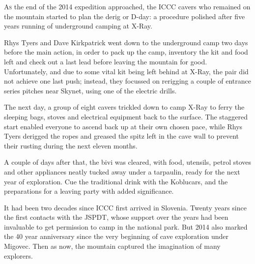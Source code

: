 \begin{tcolorbox}


	\lettrine{A}{s} the end of the 2014 expedition approached, the ICCC cavers who remained on the mountain started to plan the derig or D-day: a procedure polished after five years running of underground camping at X-Ray. 

	Rhys Tyers and Dave Kirkpatrick went down to the underground camp two days before the main action, in order to pack up the camp, inventory the kit and food left and check out a last lead before leaving the mountain for good. Unfortunately, and due to some vital kit being left behind at X-Ray, the pair did not achieve one last push; instead, they focussed on rerigging a couple of entrance series pitches near Skynet, using one of the electric drills. 

	The next day, a group of eight cavers trickled down to camp X-Ray to ferry the sleeping bags, stoves and electrical equipment back to the surface. The staggered start enabled everyone to ascend back up at their own chosen pace, while Rhys Tyers derigged the ropes and greased the spitz left in the cave wall to prevent their rusting during the next eleven months.

	A couple of days after that, the bivi was cleared, with food, utensils, petrol stoves and other appliances neatly tucked away under a tarpaulin, ready for the next year of exploration. Cue the traditional drink with the Koblucars, and the preparations for a leaving party with added significance.

	It had been two decades since ICCC first arrived in Slovenia. Twenty years since the first contacts with the JSPDT, whose support over the years had been invaluable to get permission to camp in the national park. But 2014 also marked the  40 year anniversary since the very beginning of cave exploration under Migovec. Then as now, the mountain captured the imagination of many explorers.
	\\
	\\
	\\
	

\end{tcolorbox}
\BgThispage
